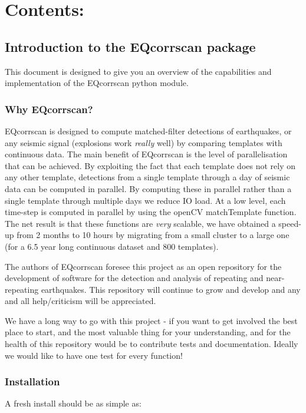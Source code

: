 \documentclass[a4paper,10pt,english]{sphinxmanual}
\begin{document}
\chapter{Contents:}
\label{index:contents}

\section{Introduction to the EQcorrscan package}
\label{intro:introduction-to-the-eqcorrscan-package}\label{intro::doc}
This document is designed to give you an overview of the capabilities and
implementation of the EQcorrscan python module.


\subsection{Why EQcorrscan?}
\label{intro:why-eqcorrscan}
EQcorrscan is designed to compute matched-filter detections of earthquakes,
or any seismic signal (explosions work \emph{really} well) by comparing templates
with continuous data.  The main benefit of EQcorrscan is the level of
parallelisation that can be achieved.  By exploiting the fact that each template
does not rely on any other template, detections from a single template through
a day of seismic data can be computed in parallel.  By computing these in parallel
rather than a single template through multiple days we reduce IO load.  At a low
level, each time-step is computed in parallel by using the openCV matchTemplate
function.  The net result is that these functions are \emph{very} scalable, we have
obtained a speed-up from 2 months to 10 hours by migrating from a small cluster
to a large one (for a 6.5 year long continuous dataset and 800 templates).

The authors of EQcorrscan foresee this project as an open repository for the
development of software for the detection and analysis of repeating and
near-repeating earthquakes.  This repository will continue to grow and develop
and any and all help/criticism will be appreciated.

We have a long way to go with this project - if you want to get involved the
best place to start, and the most valuable thing for your understanding, and
for the health of this repository would be to contribute tests and
documentation.  Ideally we would like to have one test for every function!


\subsection{Installation}
\label{intro:installation}
A fresh install should be as simple as:
\end{document}
